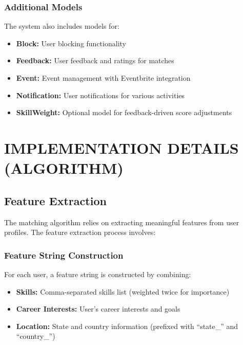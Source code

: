 \documentclass[12pt,a4paper]{report}
\let\origsection\section
\renewcommand{\section}{\needspace{4\baselineskip}\origsection}
\let\origsubsection\subsection
\renewcommand{\subsection}{\needspace{4\baselineskip}\origsubsection}
\begin{document}
\subsection{Additional Models}

The system also includes models for:
\begin{itemize}[noitemsep]
    \item \textbf{Block:} User blocking functionality
    \item \textbf{Feedback:} User feedback and ratings for matches
    \item \textbf{Event:} Event management with Eventbrite integration
    \item \textbf{Notification:} User notifications for various activities
    \item \textbf{SkillWeight:} Optional model for feedback-driven score adjustments
\end{itemize}


\chapter{IMPLEMENTATION DETAILS (ALGORITHM)}
\thispagestyle{fancy}

\section{Feature Extraction}

The matching algorithm relies on extracting meaningful features from user profiles. The feature extraction process involves:

\subsection{Feature String Construction}

For each user, a feature string is constructed by combining:
\begin{itemize}[noitemsep]
    \item \textbf{Skills:} Comma-separated skills list (weighted twice for importance)
    \item \textbf{Career Interests:} User's career interests and goals
    \item \textbf{Location:} State and country information (prefixed with ``state\_'' and ``country\_'')
\end{itemize}
\end{document}
